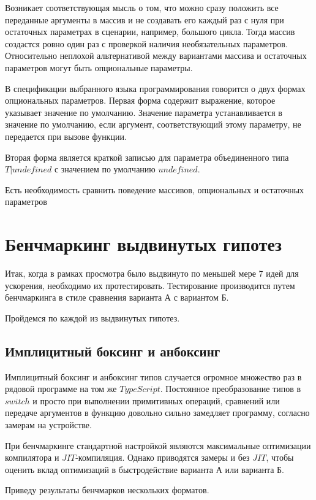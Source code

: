 \documentclass{mipt-thesis-bs}
\begin{document}
Возникает соответствующая мысль о том, что можно сразу положить все переданные
аргументы в массив и не создавать его каждый раз с нуля при остаточных параметрах
в сценарии, например, большого цикла. Тогда массив создастся ровно один раз с проверкой
наличия необязательных параметров. Относительно неплохой альтернативой между
вариантами массива и остаточных параметров могут быть опциональные параметры.

В спецификации выбранного языка программирования говорится о двух формах
опциональных параметров. Первая форма содержит выражение, которое
указывает значение по умолчанию. Значение параметра устанавливается
в значение по умолчанию, если аргумент, соответствующий
этому параметру, не передается при вызове функции.

Вторая форма является краткой записью для параметра объединенного типа
$T | undefined$ с значением по умолчанию $undefined$.

Есть необходимость сравнить поведение массивов, опциональных и остаточных параметров

\section{Бенчмаркинг выдвинутых гипотез}

Итак, когда в рамках просмотра было выдвинуто по меньшей мере 7 идей для ускорения,
необходимо их протестировать. Тестирование производится путем бенчмаркинга в стиле
сравнения варианта А с вариантом Б.

Пройдемся по каждой из выдвинутых гипотез.
\subsection{Имплицитный боксинг и анбоксинг}
Имплицитный боксинг и анбоксинг типов случается огромное множество раз в рядовой программе
на том же $TypeScript$. Постоянное преобразование типов в $switch$ и просто при выполнении
примитивных операций, сравнений или передаче аргументов в функцию довольно сильно замедляет
программу, согласно замерам на устройстве.

При бенчмаркинге стандартной
настройкой являются максимальные оптимизации компилятора и $JIT$-компиляция.
Однако приводятся замеры и без $JIT$, чтобы оценить вклад оптимизаций
в быстродействие варианта А или варианта Б.

Приведу результаты бенчмарков нескольких форматов.
\end{document}
